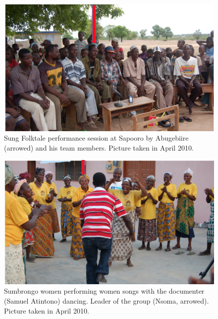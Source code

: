 \documentclass[output=paper,colorlinks,citecolor=brown]{langscibook}
\begin{document}
\begin{figure}
\includegraphics[width=\textwidth]{figures/abugebiire.png}
\caption{Sung Folktale performance session at Sapooro by Abugebiire (arrowed) and his team members. Picture taken in April 2010.
}

\end{figure}


\begin{figure}
\includegraphics[width=\textwidth]{figures/sumbrongo.png}
\caption{Sumbrongo women performing women songs with the documenter (Samuel Atintono) dancing. Leader of the group (Nsoma, arrowed). Picture taken in April 2010.}
\end{figure}
\end{document}
